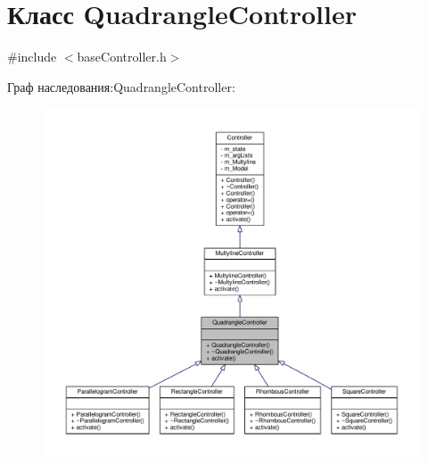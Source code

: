 \hypertarget{class_quadrangle_controller}{\section{Класс Quadrangle\-Controller}
\label{class_quadrangle_controller}
}


{\ttfamily \#include $<$base\-Controller.\-h$>$}



Граф наследования\-:Quadrangle\-Controller\-:
\nopagebreak
\begin{figure}[H]
\begin{center}
\leavevmode
\includegraphics[width=350pt]{class_quadrangle_controller__inherit__graph}
\end{center}
\end{figure}


